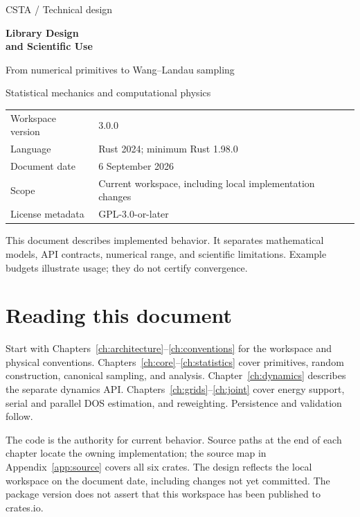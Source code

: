 \documentclass[11pt,a4paper,oneside]{report}
\begin{document}
\begin{titlepage}
\vspace*{22mm}
{\Large\color{ink} CSTA \quad / \quad Technical design\par}
\vspace{12mm}
{\Huge\bfseries Library Design\\[3mm] and Scientific Use\par}
\vspace{9mm}
{\Large From numerical primitives to Wang--Landau sampling\par}
\vspace{18mm}
{\large Statistical mechanics and computational physics\par}
\vfill
\begin{tabular}{@{}ll@{}}
Workspace version & 3.0.0\\
Language & Rust 2024; minimum Rust 1.98.0\\
Document date & 6 September 2026\\
Scope & Current workspace, including local implementation changes\\
License metadata & GPL-3.0-or-later
\end{tabular}
\vspace{12mm}

This document describes implemented behavior. It separates mathematical models,
API contracts, numerical range, and scientific limitations. Example budgets
illustrate usage; they do not certify convergence.
\end{titlepage}
\chapter*{Reading this document}
Start with Chapters~\ref{ch:architecture}--\ref{ch:conventions} for the workspace
and physical conventions. Chapters~\ref{ch:core}--\ref{ch:statistics} cover
primitives, random construction, canonical sampling, and analysis.
Chapter~\ref{ch:dynamics} describes the separate dynamics API.
Chapters~\ref{ch:grids}--\ref{ch:joint} cover energy support, serial and parallel
DOS estimation, and reweighting. Persistence and validation follow.

The code is the authority for current behavior. Source paths at the end of each
chapter locate the owning implementation; the source map in
Appendix~\ref{app:source} covers all six crates. The design reflects the local
workspace on the document date, including changes not yet committed. The package
version does not assert that this workspace has been published to crates.io.
\end{document}
